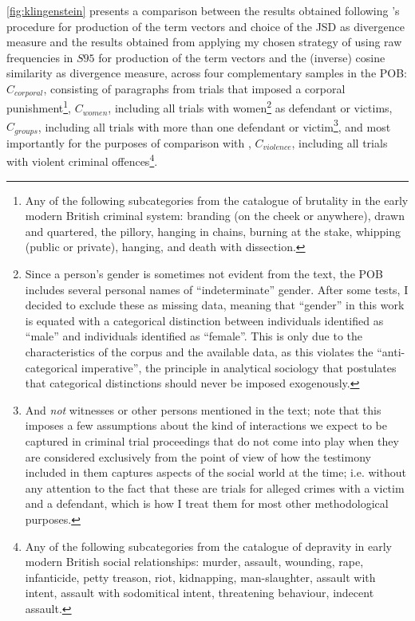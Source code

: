 \autoref{fig:klingenstein} presents a comparison between the results obtained following \citeauthor{klingenstein2014}'s procedure for production of the term vectors and choice of the JSD as divergence measure and the results obtained from applying my chosen strategy of using raw frequencies in $S95$ for production of the term vectors and the (inverse) cosine similarity as divergence measure, across four complementary samples in the POB: $C_{corporal}$, consisting of paragraphs from trials that imposed a corporal punishment\footnote{
    Any of the following subcategories from the catalogue of brutality in the early modern British criminal system:
    branding (on the cheek or anywhere), drawn and quartered, the pillory, hanging in chains, burning at the stake, whipping (public or private), hanging, and death with dissection.
}, $C_{women}$, including all trials with women\footnote{
    Since a person's gender is sometimes not evident from the text, the POB includes several personal names of ``indeterminate'' gender.
    After some tests, I decided to exclude these as missing data, meaning that ``gender'' in this work is equated with a categorical distinction between individuals identified as ``male'' and individuals identified as ``female''.
    This is only due to the characteristics of the corpus and the available data, as this violates the ``anti-categorical imperative'', the principle in analytical sociology that postulates that categorical distinctions should never be imposed exogenously.
} as defendant or victims, $C_{groups}$, including all trials with more than one defendant or victim\footnote{
    And \emph{not} witnesses or other persons mentioned in the text; note that this imposes a few assumptions about the kind of interactions we expect to be captured in criminal trial proceedings that do not come into play when they are considered exclusively from the point of view of how the testimony included in them captures aspects of the social world at the time; i.e. without any attention to the fact that these are trials for alleged crimes with a victim and a defendant, which is how I treat them for most other methodological purposes.
}, and most importantly for the purposes of comparison with \citeauthor{klingenstein2014}, $C_{violence}$, including all trials with violent criminal offences\footnote{
    Any of the following subcategories from the catalogue of depravity in early modern British social relationships: murder, assault, wounding, rape, infanticide, petty treason, riot, kidnapping, man-slaughter, assault with intent, assault with sodomitical intent, threatening behaviour, indecent assault.
}.

